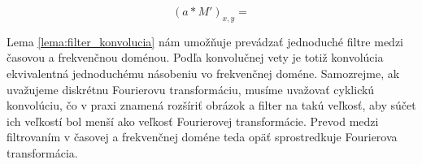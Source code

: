 \begin{dokaz}
    \begin{equation}
        (a * M')_{x,y} = 
    \end{equation}
\end{dokaz}
Lema \ref{lema:filter_konvolucia} nám umožňuje prevádzať jednoduché
filtre medzi časovou a frekvenčnou doménou. Podľa konvolučnej vety je
totiž konvolúcia ekvivalentná jednoduchému násobeniu vo frekvenčnej
doméne. Samozrejme, ak uvažujeme diskrétnu Fourierovu transformáciu,
musíme uvažovať cyklickú konvolúciu, čo v praxi znamená rozšíriť
obrázok a filter na takú veľkosť, aby súčet ich veľkostí bol menší ako
veľkosť Fourierovej transformácie. Prevod medzi filtrovaním v časovej
a frekvenčnej doméne teda opäť sprostredkuje Fourierova
transformácia.

%
%

